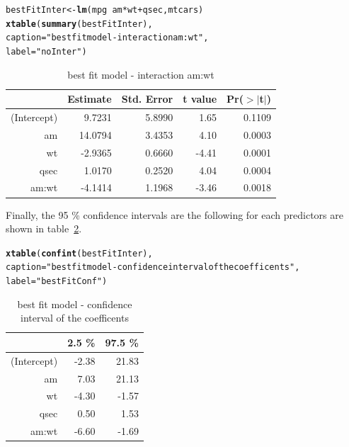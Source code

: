 \documentclass[a4paper, 11pt]{article}\usepackage[]{graphicx}\usepackage[]{color}
\makeatletter
\newcommand{\hlstr}[1]{\textcolor[rgb]{0.192,0.494,0.8}{#1}}%
\newcommand{\hlopt}[1]{\textcolor[rgb]{0,0,0}{#1}}%
\newcommand{\hlstd}[1]{\textcolor[rgb]{0.345,0.345,0.345}{#1}}%
\newcommand{\hlkwb}[1]{\textcolor[rgb]{0.69,0.353,0.396}{#1}}%
\newcommand{\hlkwc}[1]{\textcolor[rgb]{0.333,0.667,0.333}{#1}}%
\newcommand{\hlkwd}[1]{\textcolor[rgb]{0.737,0.353,0.396}{\textbf{#1}}}%
\newenvironment{kframe}{%
 \def\at@end@of@kframe{}%
 \ifinner\ifhmode%
  \def\at@end@of@kframe{\end{minipage}}%
  \begin{minipage}{\columnwidth}%
 \fi\fi%
 \def\FrameCommand##1{\hskip\@totalleftmargin \hskip-\fboxsep
 \colorbox{shadecolor}{##1}\hskip-\fboxsep
     \hskip-\linewidth \hskip-\@totalleftmargin \hskip\columnwidth}%
 \MakeFramed {\advance\hsize-\width
   \@totalleftmargin\z@ \linewidth\hsize
   \@setminipage}}%
 {\par\unskip\endMakeFramed%
 \at@end@of@kframe}
\makeatother
\begin{document}
\begin{kframe}
\begin{alltt}
\hlstd{bestFitInter} \hlkwb{<-} \hlkwd{lm}\hlstd{(mpg}\hlopt{~}\hlstd{am}\hlopt{*}\hlstd{wt}\hlopt{+}\hlstd{qsec,mtcars)}
\hlkwd{xtable}\hlstd{(}\hlkwd{summary}\hlstd{(bestFitInter),}
       \hlkwc{caption}\hlstd{=}\hlstr{"best fit model - interaction am:wt"}\hlstd{,}
       \hlkwc{label}\hlstd{=}\hlstr{"noInter"}\hlstd{)}
\end{alltt}
\end{kframe}%
\begin{table}[ht]
\centering
\begin{tabular}{rrrrr}
  \hline
 & Estimate & Std. Error & t value & Pr($>$$|$t$|$) \\ 
  \hline
(Intercept) & 9.7231 & 5.8990 & 1.65 & 0.1109 \\ 
  am & 14.0794 & 3.4353 & 4.10 & 0.0003 \\ 
  wt & -2.9365 & 0.6660 & -4.41 & 0.0001 \\ 
  qsec & 1.0170 & 0.2520 & 4.04 & 0.0004 \\ 
  am:wt & -4.1414 & 1.1968 & -3.46 & 0.0018 \\ 
   \hline
\end{tabular}
\caption{best fit model - interaction am:wt} 
\label{noInter}
\end{table}


Finally, the 95 \% confidence intervals are the following for each predictors are shown in table~\ref{bestFitConf}.

\begin{kframe}
\begin{alltt}
\hlkwd{xtable}\hlstd{(}\hlkwd{confint}\hlstd{(bestFitInter),}
       \hlkwc{caption}\hlstd{=}\hlstr{"best fit model - confidence interval of the coefficents"}\hlstd{,}
       \hlkwc{label}\hlstd{=}\hlstr{"bestFitConf"}\hlstd{)}
\end{alltt}
\end{kframe}%
\begin{table}[ht]
\centering
\begin{tabular}{rrr}
  \hline
 & 2.5 \% & 97.5 \% \\ 
  \hline
(Intercept) & -2.38 & 21.83 \\ 
  am & 7.03 & 21.13 \\ 
  wt & -4.30 & -1.57 \\ 
  qsec & 0.50 & 1.53 \\ 
  am:wt & -6.60 & -1.69 \\ 
   \hline
\end{tabular}
\caption{best fit model - confidence interval of the coefficents} 
\label{bestFitConf}
\end{table}
\end{document}
